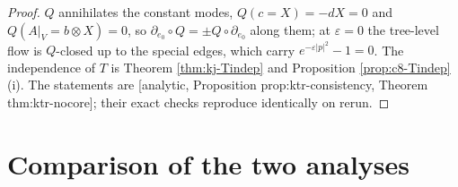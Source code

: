 \begin{proof}
$Q$ annihilates the constant modes, $Q(c=X)=-dX=0$ and $Q(A|_V=b\otimes X)=0$, so $\partial_{e_0}\circ Q=\pm Q\circ\partial_{e_0}$ along them; at $\varepsilon=0$ the tree-level flow is $Q$-closed up to the special edges, which carry $e^{-\varepsilon|p|^2}-1=0$. The independence of $T$ is Theorem \ref{thm:kj-Tindep} and Proposition \ref{prop:c8-Tindep} (i). The statements are [analytic, Proposition prop:ktr-consistency, Theorem thm:ktr-nocore]; their exact checks reproduce identically on rerun.
\end{proof}

\section{Comparison of the two analyses}

